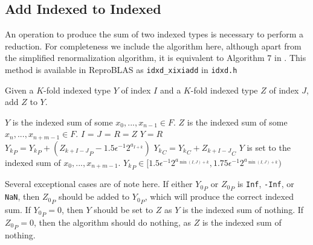 \subsection{Add Indexed to Indexed}
    \label{sec:primitiveops_addindexedtoindexed}
    An operation to produce the sum of two indexed types is necessary to
    perform a reduction. For completeness we include the algorithm here,
    although apart from the simplified renormalization algorithm, it is
    equivalent to Algorithm $7$ in \cite{repsum}.
    This method is available in ReproBLAS as \texttt{idxd_xixiadd} in \texttt{idxd.h}

    \begin{samepage}
    \begin{alg}
      Given a $K$-fold indexed type $Y$ of index $I$ and a $K$-fold indexed
      type $Z$ of index $J$, add $Z$ to $Y$.
      \begin{algorithmic}[1]
        \Require
          \Statex $Y$ is the indexed sum of some $x_0, ..., x_{n - 1} \in F$.
          \Statex $Z$ is the indexed sum of some $x_n, ..., x_{n + m - 1} \in F$.
          \State $I$ = 
          \State $J$ = 
            \State $R = Z$
            \State {}
            \State $Y = R$
            \State \Return
          \EndIf
           \label{alg:addindexedtoindexed:beginfor}
            \State ${Y_{k}}_P = {Y_{k}}_P + ({Z_{k + I-J}}_P - 1.5 \epsilon^{-1}  2^{a_{I+k}})$\label{alg:addindexedtoindexed:pri}
            \State ${Y_{k}}_C = {Y_{k}}_C + {Z_{k + I - J}}_C$\label{alg:addindexedtoindexed:car}
          \EndFor
          \State {}\label{alg:addindexedtoindexed:renorm}
        \EndFunction
        \Ensure
          \Statex $Y$ is set to the indexed sum of $x_0, ..., x_{n + m - 1}$.
          \Statex ${Y_k}_P \in [1.5  \epsilon^{-1} 2^{a_{\min(I, J) + k}}, 1.75  \epsilon^{-1} 2^{a_{\min(I, J) + k}})$
      \end{algorithmic}
      \label{alg:addindexedtoindexed}
    \end{alg}
    \end{samepage}
    Several exceptional cases are of note here. If either ${Y_0}_P$ or ${Z_0}_P$ is \texttt{Inf}, \texttt{-Inf}, or \texttt{NaN}, then ${Z_0}_P$ should be added to ${Y_0}_P$, which will produce the correct indexed sum. If ${Y_0}_P = 0$, then $Y$ should be set to $Z$ as $Y$ is the indexed sum of nothing. If ${Z_0}_P = 0$, then the algorithm should do nothing, as $Z$ is the indexed sum of nothing.

